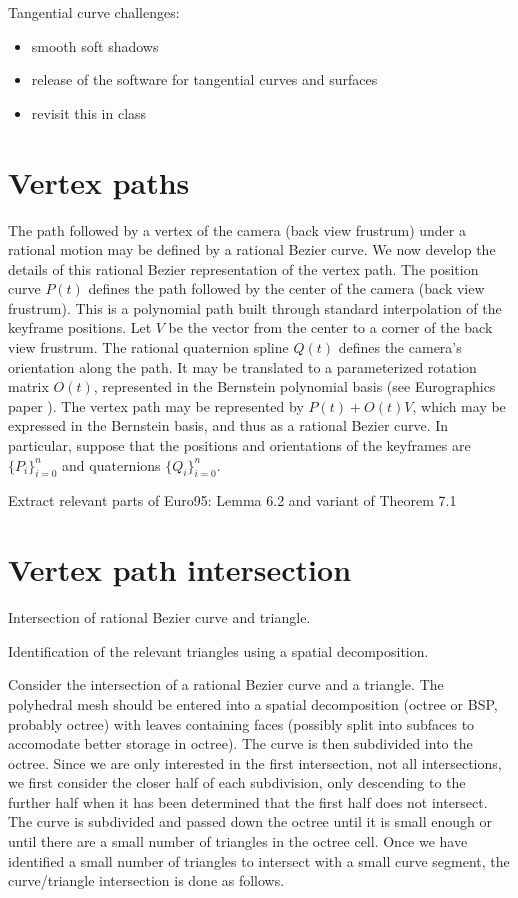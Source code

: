 \documentclass[12pt]{article}
\begin{document}
Tangential curve challenges:
\begin{itemize}
\item smooth soft shadows
\item release of the software for tangential curves and surfaces
\item revisit this in class
\end{itemize}

\section{Vertex paths}

The path followed by a vertex of the camera (back view frustrum)
under a rational motion may be defined by a rational Bezier curve.
We now develop the details of this rational Bezier representation of the vertex path.
The position curve $P(t)$ defines the path followed by the center of the camera 
(back view frustrum).
This is a polynomial path built through standard interpolation of the keyframe positions.
Let $V$ be the vector from the center to a corner of the back view frustrum.
The rational quaternion spline $Q(t)$ defines the camera's orientation along the path.
It may be translated to a parameterized rotation matrix $O(t)$,
represented in the Bernstein polynomial basis (see Eurographics paper \cite{jjjimbo95b}).
The vertex path may be represented by $P(t) + O(t)V$, which may be expressed
in the Bernstein basis, and thus as a rational Bezier curve.
In particular, suppose that the positions and orientations of the keyframes
are $\{P_i\}_{i=0}^n$ and quaternions $\{Q_i\}_{i=0}^n$.

Extract relevant parts of Euro95: Lemma 6.2 and variant of Theorem 7.1

\section{Vertex path intersection}

Intersection of rational Bezier curve and triangle.

Identification of the relevant triangles using a spatial decomposition.

Consider the intersection of a rational Bezier curve and a triangle.
The polyhedral mesh should be entered into a spatial decomposition (octree or BSP, probably octree)
with leaves containing faces (possibly split into subfaces to accomodate better
storage in octree).
The curve is then subdivided into the octree.
Since we are only interested in the first intersection, not all intersections,
we first consider the closer half of each subdivision, only descending to the further
half when it has been determined that the first half does not intersect.
The curve is subdivided and passed down the octree until it is small enough
or until there are a small number of triangles in the octree cell.
Once we have identified a small number of triangles to intersect with a small curve segment, the curve/triangle intersection is done as follows.
\end{document}
